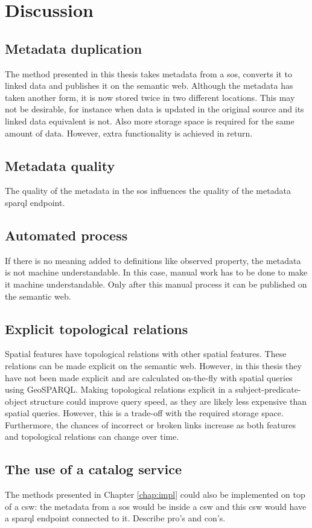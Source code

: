 
\chapter{Discussion}
\label{chap:disc}

\section{Metadata duplication}
The method presented in this thesis takes metadata from a \ac{sos}, converts it to linked data and publishes it on the semantic web. Although the metadata has taken another form, it is now stored twice in two different locations. This may not be desirable, for instance when data is updated in the original source and its linked data equivalent is not. Also more storage space is required for the same amount of data. However, extra functionality is achieved in return.  

\section{Metadata quality}
The quality of the metadata in the \ac{sos} influences the quality of the metadata \ac{sparql} endpoint. 

\section{Automated process}
If there is no meaning added to definitions like observed property, the metadata is not machine understandable. In this case, manual work has to be done to make it machine understandable. Only after this manual process it can be published on the semantic web.

\section{Explicit topological relations}
Spatial features have topological relations with other spatial features. These relations can be made explicit on the semantic web. However, in this thesis they have not been made explicit and are calculated on-the-fly with spatial queries using GeoSPARQL. Making topological relations explicit in a subject-predicate-object structure could improve query speed, as they are likely less expensive than spatial queries. However, this is a trade-off with the required storage space. Furthermore, the chances of incorrect or broken links increase as both features and topological relations can change over time.

\section{The use of a catalog service}
The methods presented in Chapter \ref{chap:impl} could also be implemented on top of a \ac{csw}: the metadata from a \ac{sos} would be inside a \ac{csw} and this \ac{csw} would have a \ac{sparql} endpoint connected to it. Describe pro's and con's.